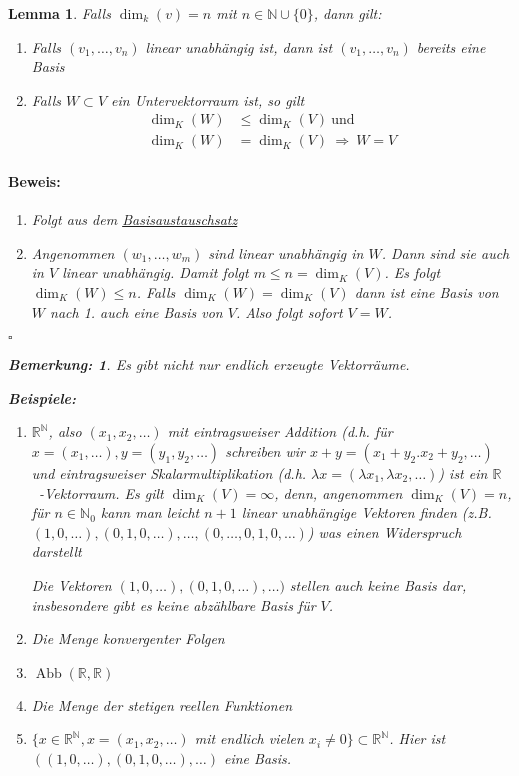 \documentclass{report}
\newcommand{\lb}{\lambda}
\newcommand{\R}{\mathbb{R}}
\newcommand{\N}{\mathbb{N}}
\newcommand{\mR}{$\mathbb{R}$\ }
\DeclareMathOperator{\abb}{Abb}
\theoremstyle{customrem}
\newtheorem*{bem}{Bemerkung:}
\theoremstyle{customdef}
\newtheorem{lem}[definition]{Lemma}
\renewenvironment{proof}{\vspace{-.75cm}\paragraph{Beweis: }}{\vspace{-.5cm}\hfill$\square$}
\begin{document}
	\begin{lem}
		Falls $\dim_k(v) = n$ mit $n \in \N \cup \{0\}$, dann gilt:
		\begin{enumerate}
			\item Falls $(v_1, \dots, v_n)$ linear unabhängig ist, dann ist $(v_1, \ldots, v_n)$ bereits eine Basis
			\item Falls $W \subset V$ ein Untervektorraum ist, so gilt
			\begin{align*}
				\dim_K(W) &\le \dim_K(V)\ \text{und}\\
				\dim_K(W) &= \dim_K(V)\ \Rightarrow \ W = V
			\end{align*}
		\end{enumerate}
		\vspace{.2cm}
		\begin{proof}
			\begin{enumerate}
				\item Folgt aus dem \hyperref[satz215]{Basisaustauschsatz}
				\item Angenommen $(w_1, \dots, w_m)$ sind linear unabhängig in $W$. Dann sind sie auch in $V$ linear unabhängig. Damit folgt $m \leq n = \dim_K(V)$. Es folgt $\dim_K(W) \leq n$. Falls $\dim_K(W) = \dim_K(V)$ dann ist eine Basis von $W$ nach 1. auch eine Basis von $V$. Also folgt sofort $V = W$.
			\end{enumerate}
		\end{proof}
		\begin{bem}
			Es gibt nicht nur endlich erzeugte Vektorräume.\\
		\end{bem}
		\begin{minipage}{\textwidth}
			\textbf{Beispiele: }
			\begin{enumerate}
				\item $\R^\N$, also $(x_1, x_2, \ldots)$ mit eintragsweiser Addition (d.h. für $x = (x_1, \ldots), y = (y_1, y_2, \ldots)$ schreiben wir $x + y = (x_1 + y_2. x_2 + y_2, \ldots)$ und eintragsweiser Skalarmultiplikation (d.h. $\lb x = (\lb x_1, \lb x_2, \ldots)$) ist ein \mR -Vektorraum. Es gilt $\dim_K(V) = \infty$, denn, angenommen $\dim_K(V) = n$, für $n \in \N_0$ kann man leicht $n + 1$ linear unabhängige Vektoren finden (z.B. $(1, 0, \ldots), (0, 1, 0, \ldots), \dots, (0, \ldots, 0, 1, 0, \ldots)$) was einen Widerspruch darstellt \Lightning
				
				Die Vektoren $(1, 0, \dots), (0, 1, 0, \dots), \dots)$ stellen auch keine Basis dar, insbesondere gibt es keine abzählbare Basis für $V$.
				\item Die Menge konvergenter Folgen
				\item $\abb(\R, \R)$
				\item Die Menge der stetigen reellen Funktionen
				\item  $\{x \in \R^\N, x = (x_1, x_2, \dots)$ mit endlich vielen $x_i \neq 0\} \subset \R^\N$. Hier ist $((1, 0, \dots), (0, 1, 0, \dots), \dots)$ eine Basis.
			\end{enumerate}
		\end{minipage}

	\end{lem}
\end{document}
